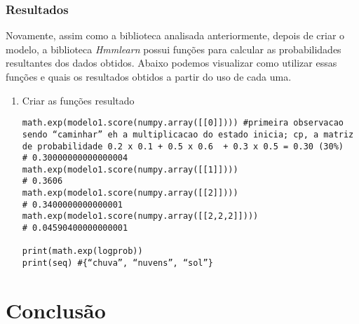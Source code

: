 \documentclass{article}
\begin{document}
\subsubsection{Resultados}
Novamente, assim como a biblioteca analisada anteriormente, depois de criar o modelo, a biblioteca \emph{Hmmlearn} possui funções para calcular as probabilidades resultantes dos dados obtidos. Abaixo podemos visualizar como utilizar essas funções e quais os resultados obtidos a partir do uso de cada uma.
\begin{enumerate}
    
\item Criar as funções resultado

\begin{verbatim}
math.exp(modelo1.score(numpy.array([[0]]))) #primeira observacao sendo “caminhar” eh a multiplicacao do estado inicia; cp, a matriz de probabilidade 0.2 x 0.1 + 0.5 x 0.6  + 0.3 x 0.5 = 0.30 (30%)
# 0.30000000000000004
math.exp(modelo1.score(numpy.array([[1]])))
# 0.3606
math.exp(modelo1.score(numpy.array([[2]])))
# 0.3400000000000001
math.exp(modelo1.score(numpy.array([[2,2,2]])))
# 0.04590400000000001

print(math.exp(logprob))
print(seq) #{“chuva”, “nuvens”, “sol”}

\end{verbatim}

\end{enumerate}
\section{Conclusão}
\end{document}
